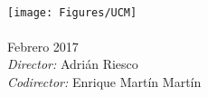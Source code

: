 \documentclass[
11pt, %
english, %
singlespacing, %
headsepline, %
]{MastersDoctoralThesis} %
\author{Mayra Alexandra Castrosqui Florián} %
\begin{document}
\frontmatter %

\pagestyle{plain} %


\begin{titlepage}
\begin{center}

\HRule \\[0.4cm] %
{\huge \bfseries \ttitle\par}\vspace{0.4cm} %
\HRule \\[1.5cm] %

\LARGE \authorname \\[0.5cm]
\textsc{\Large \degreename}\\ %
\textsc{\Large \facname}\\ %
\textsc{\Large \univname}\\[1.5cm] %

\texttt{[image: Figures/UCM]} \\[1.5cm] %


\textsc{\LARGE \subjectname}\\ %
\Large Febrero 2017 \\[1.5cm] 

\large \emph{Director:} Adrián Riesco \\
\large \emph{Codirector:} Enrique Martín Martín \\
 
\vfill
\end{center}
\end{titlepage}



\end{document}
